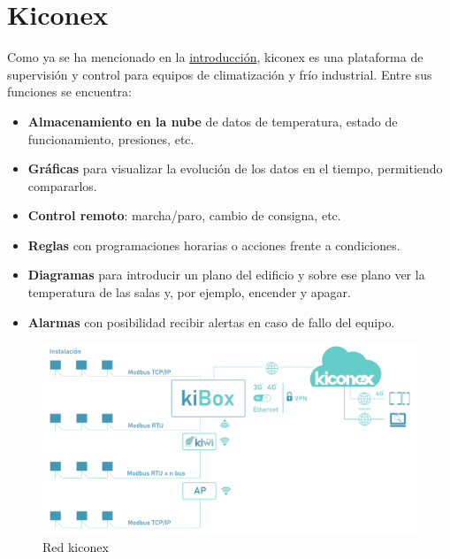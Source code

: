 
\section{Kiconex}
\label{sec:kiconex}

Como ya se ha mencionado en la \hyperref[chap:intro]{introducción}, kiconex es una plataforma de supervisión y control para equipos de climatización y frío industrial. Entre sus funciones se encuentra:
\begin{itemize}
  \item \textbf{Almacenamiento en la nube} de datos de temperatura, estado de funcionamiento, presiones, etc.  
  \item \textbf{Gráficas} para visualizar la evolución de los datos en el tiempo, permitiendo compararlos. 
  \item \textbf{Control remoto}: marcha/paro, cambio de consigna, etc.
  \item \textbf{Reglas} con programaciones horarias o acciones frente a condiciones. 
  \item \textbf{Diagramas} para introducir un plano del edificio y sobre ese plano ver la temperatura de las salas y, por ejemplo, encender y apagar.
  \item \textbf{Alarmas} con posibilidad recibir alertas en caso de fallo del equipo. 
\end{itemize}

\begin{figure}[H]
  \centering
  \includegraphics[width=\textwidth, keepaspectratio]{img/redKiconex}
  \caption{Red kiconex}
  \label{figura:redKiconex}
\end{figure}

